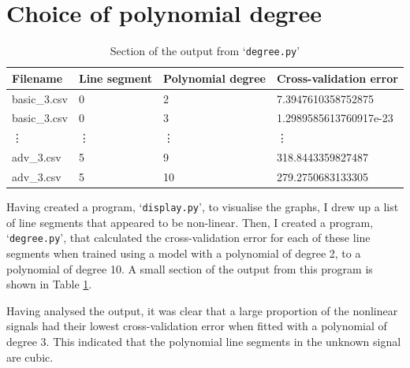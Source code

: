 \documentclass[onecolumn, 12pt, a4paper]{article}
\begin{document}
\section{Choice of polynomial degree}

\begin{table}[htbp]
    \begin{center}
        \caption{\label{tab:degree.py}Section of the output from `\texttt{degree.py}'}
    \begin{tabular}{l l l l} 
        \hline\hline
        Filename & Line segment & Polynomial degree & Cross-validation error \\ [0.5ex] 
        \hline
        basic\_3.csv & 0 & 2 & 7.3947610358752875 \\ 
        basic\_3.csv & 0 & 3 & 1.2989585613760917e-23 \\
        \vdots & \vdots & \vdots & \vdots \\
        adv\_3.csv & 5 & 9 & 318.8443359827487 \\
        adv\_3.csv & 5 & 10 & 279.2750683133305 \\
        \hline
    \end{tabular}
    \end{center}
\end{table}

Having created a program, `\texttt{display.py}', to visualise
the graphs, I drew up a list of line segments that appeared to
be non-linear.
Then, I created a program, `\texttt{degree.py}', that calculated
the cross-validation error for each of these line segments
when trained using a model with a polynomial of degree 2,
to a polynomial of degree 10. A small section of the output
from this program is shown in Table \ref{tab:degree.py}.

Having analysed the output, it was clear that a large
proportion of the nonlinear signals had their lowest
cross-validation error when fitted with a polynomial of degree
3.
This indicated that the polynomial line segments in 
the unknown signal are cubic.
\end{document}
